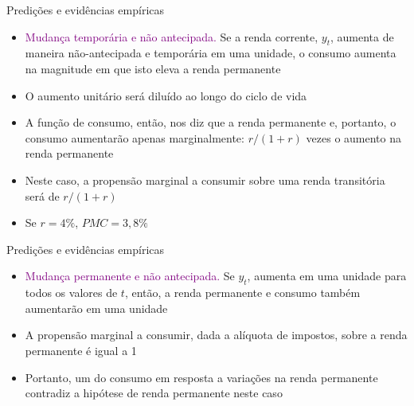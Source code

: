 \documentclass[10pt]{beamer}
\begin{document}
\begin{frame}
    {Predições e evidências empíricas}
    \begin{itemize}
        \item \textcolor{purple}{Mudança temporária e não antecipada.} Se a renda corrente, $y_t$, aumenta de maneira não-antecipada e temporária em uma unidade, o consumo aumenta na magnitude em que isto eleva a renda permanente\bigskip
        \item O aumento unitário será diluído ao longo do ciclo de vida\bigskip
        \item A função de consumo, então, nos diz que a renda permanente e, portanto, o consumo aumentarão apenas marginalmente: $r/(1 + r)$ vezes o aumento na renda permanente\bigskip
        \item Neste caso, a propensão marginal a consumir sobre uma renda transitória será de $r/(1+r)$\bigskip
        \item Se $r = 4\%$, $PMC = 3,8\%$
    \end{itemize}
\end{frame}

\begin{frame}
    {Predições e evidências empíricas}
    \begin{itemize}
        \item \textcolor{purple}{Mudança permanente e não antecipada.} Se $y_t$, aumenta em uma unidade para todos os valores de $t$, então, a renda permanente e consumo também aumentarão em uma unidade\bigskip
        \item A propensão marginal a consumir, dada a alíquota de impostos, sobre a renda permanente é igual a 1\bigskip
        \item Portanto, um  do consumo em resposta a variações na renda permanente contradiz a hipótese de renda permanente neste caso
    \end{itemize}
\end{frame}
\end{document}
